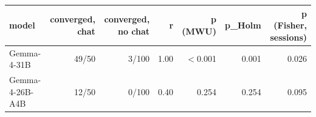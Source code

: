 \begin{tabular}{lrrrrrr}
\toprule
\textbf{model} & \textbf{converged, chat} & \textbf{converged, no chat} & \textbf{r} & \textbf{p (MWU)} & \textbf{p\_Holm} & \textbf{p (Fisher, sessions)} \\
\midrule
Gemma-4-31B & 49/50 & 3/100 & 1.00 & $<$0.001 & 0.001 & 0.026 \\
Gemma-4-26B-A4B & 12/50 & 0/100 & 0.40 & 0.254 & 0.254 & 0.095 \\
\bottomrule
\end{tabular}
